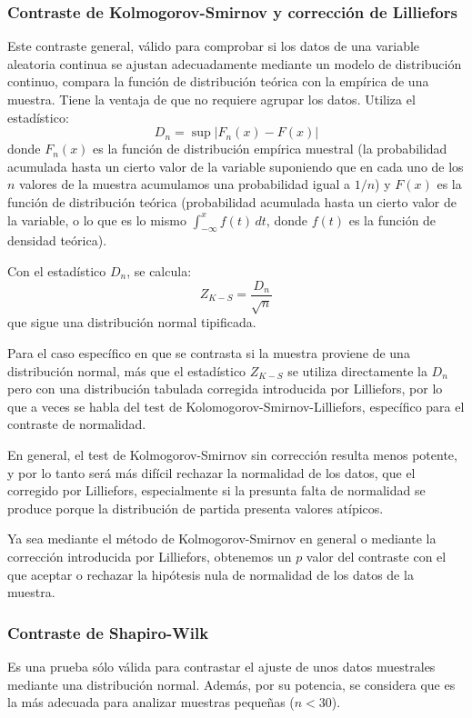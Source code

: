 \begin{description}
\subsubsection{Contraste de Kolmogorov-Smirnov y corrección de Lilliefors}
Este contraste general, válido para comprobar si los datos de una
variable aleatoria continua se ajustan adecuadamente mediante un
modelo de distribución continuo, compara la función de
distribución teórica con la empírica de una muestra. Tiene la
ventaja de que no requiere agrupar los datos. Utiliza el
estadístico:
\[
D_n = \sup |F_n(x)-F(x)|
\]
donde $F_n (x)$ es la función de distribución empírica muestral
(la probabilidad acumulada hasta un cierto valor de la variable
suponiendo que en cada uno de los $n$ valores de la muestra
acumulamos una probabilidad igual a $1/n$) y $F(x)$ es la función
de distribución teórica (probabilidad acumulada hasta un cierto
valor de la variable, o lo que es lo mismo $\int_{-\infty}^x f(t)\,dt$, donde $f(t)$ es la función de densidad teórica).

Con el estadístico $D_n$, se calcula:
\[
Z_{K-S} = \frac{D_n}{\sqrt n}
\]
que sigue una distribución normal tipificada.

Para el caso específico en que se contrasta si la muestra proviene de una distribución normal, más que el estadístico $Z_{K-S}$ se utiliza directamente la $D_n$ pero con una distribución tabulada corregida introducida por Lilliefors, por lo que a veces se habla del test de Kolomogorov-Smirnov-Lilliefors, específico para el contraste de normalidad.

En general, el test de Kolmogorov-Smirnov sin corrección resulta menos potente, y por lo tanto será más difícil rechazar la normalidad de los datos, que el corregido por Lilliefors, especialmente si la presunta falta de normalidad se produce porque la distribución de partida presenta valores atípicos.

Ya sea mediante el método de Kolmogorov-Smirnov en general o mediante la corrección introducida por Lilliefors, obtenemos un $p$ valor del contraste con el que aceptar o rechazar la hipótesis nula de normalidad de los datos de la muestra.


\subsubsection{Contraste de Shapiro-Wilk}

Es una prueba sólo válida para contrastar el ajuste de unos datos muestrales mediante una distribución normal. Además, por su potencia, se considera que es la más adecuada para analizar muestras pequeñas ($n<30$).


\end{description}
